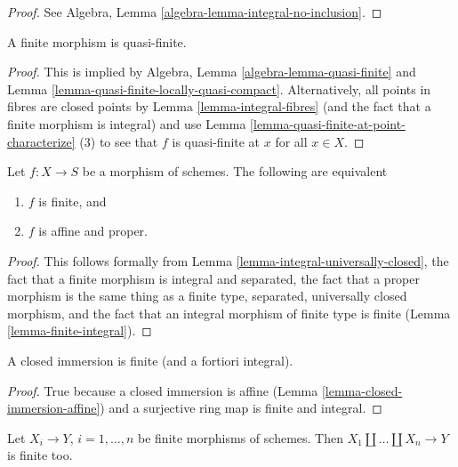\begin{proof}
See Algebra, Lemma \ref{algebra-lemma-integral-no-inclusion}.
\end{proof}

\begin{lemma}
\label{lemma-finite-quasi-finite}
A finite morphism is quasi-finite.
\end{lemma}

\begin{proof}
This is implied by Algebra, Lemma \ref{algebra-lemma-quasi-finite}
and Lemma \ref{lemma-quasi-finite-locally-quasi-compact}.
Alternatively, all points in fibres are closed points by
Lemma \ref{lemma-integral-fibres} (and the fact that a finite
morphism is integral) and use
Lemma \ref{lemma-quasi-finite-at-point-characterize} (3) to
see that $f$ is quasi-finite at $x$ for all $x \in X$.
\end{proof}

\begin{lemma}
\label{lemma-finite-proper}
Let $f : X \to S$ be a morphism of schemes. The following are equivalent
\begin{enumerate}
\item $f$ is finite, and
\item $f$ is affine and proper.
\end{enumerate}
\end{lemma}

\begin{proof}
This follows formally from
Lemma \ref{lemma-integral-universally-closed},
the fact that a finite morphism is integral and separated,
the fact that a proper morphism is the same thing as
a finite type, separated, universally closed morphism,
and the fact that an integral morphism of finite type is
finite (Lemma \ref{lemma-finite-integral}).
\end{proof}

\begin{lemma}
\label{lemma-closed-immersion-finite}
A closed immersion is finite (and a fortiori integral).
\end{lemma}

\begin{proof}
True because a closed immersion is affine
(Lemma \ref{lemma-closed-immersion-affine})
and a surjective ring map is finite and integral.
\end{proof}

\begin{lemma}
\label{lemma-finite-union-finite}
Let $X_i \to Y$, $i = 1, \ldots, n$ be finite morphisms of schemes.
Then $X_1 \amalg \ldots \amalg X_n \to Y$ is finite too.
\end{lemma}

